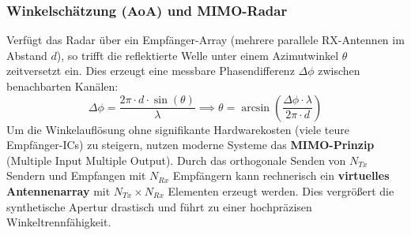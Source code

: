 \documentclass[8pt,a4paper]{article}
\begin{document}
\subsubsection{Winkelschätzung (AoA) und MIMO-Radar}
Verfügt das Radar über ein Empfänger-Array (mehrere parallele RX-Antennen im Abstand $d$), so trifft die reflektierte Welle unter einem Azimutwinkel $\theta$ zeitversetzt ein. Dies erzeugt eine messbare Phasendifferenz $\Delta \phi$ zwischen benachbarten Kanälen:
\begin{equation}
    \Delta \phi = \frac{2\pi \cdot d \cdot \sin(\theta)}{\lambda} \implies \theta = \arcsin\left( \frac{\Delta \phi \cdot \lambda}{2\pi \cdot d} \right)
\end{equation}
Um die Winkelauflösung ohne signifikante Hardwarekosten (viele teure Empfänger-ICs) zu steigern, nutzen moderne Systeme das \textbf{MIMO-Prinzip} (Multiple Input Multiple Output). Durch das orthogonale Senden von $N_{Tx}$ Sendern und Empfangen mit $N_{Rx}$ Empfängern kann rechnerisch ein \textbf{virtuelles Antennenarray} mit $N_{Tx} \times N_{Rx}$ Elementen erzeugt werden. Dies vergrößert die synthetische Apertur drastisch und führt zu einer hochpräzisen Winkeltrennfähigkeit.
\end{document}
